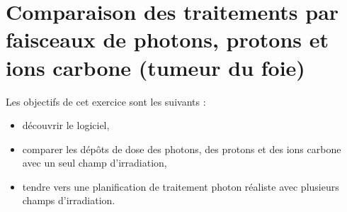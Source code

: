 \documentclass[a4paper,12pt,notitlepage]{article}	%
\begin{document}
\section{Comparaison des traitements par faisceaux de photons, protons et ions carbone (tumeur du foie)}

Les objectifs de cet exercice sont les suivants :
\begin{itemize}
  \item  découvrir le logiciel,
  \item comparer les dépôts de dose des photons, des protons et des ions carbone avec un seul champ d'irradiation,
	\item tendre vers une planification de traitement photon réaliste avec plusieurs champs d'irradiation.
\end{itemize}
\end{document}
